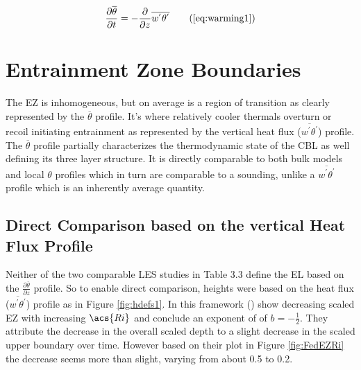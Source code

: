 \begin{equation}
\frac{\partial \overline{\theta}}{\partial t} = -\frac{\partial}{\partial z}\overline{w^{'}\theta^{'}} \tag{\ref{eq:warming1}}
\end{equation}

\section{Entrainment Zone Boundaries}
\label{sec:ezbound}
The \acs{EZ} is inhomogeneous, but on average is a region of transition as clearly represented by the $\overline{\theta}$ profile.  It's where relatively cooler thermals overturn or recoil initiating entrainment as represented by the vertical heat flux ($\overline{w^{'}\theta^{'}}$) profile.  The $\overline{\theta}$ profile partially characterizes the thermodynamic state of the \acs{CBL} as well defining its three layer structure.  It is directly comparable to both bulk models and local $\theta$ profiles which in turn are comparable to a sounding, unlike a $\overline{w^{'}\theta^{'}}$ profile which is an inherently average quantity.\\

\subsection{Direct Comparison based on the vertical Heat Flux Profile}
\label{subsec:comphfl}
Neither of the two comparable \acs{LES} studies in Table 3.3 define the \acs{EL} based on the $\frac{\partial \overline{\theta}}{\partial z}$ profile.  So to enable direct comparison, heights were based on the heat flux ($\overline{w^{'}\theta^{'}}$) profile as in Figure \ref{fig:hdefs1}.  In this framework \citeauthor{FedConzMir04} (\citeyear{FedConzMir04}) show decreasing scaled \acs{EZ} with increasing $\acs{Ri}$ and conclude an exponent of of $b = -\frac{1}{2}$.  They attribute the decrease in the overall scaled depth to a slight decrease in the scaled upper boundary over time.  However based on their plot in Figure \ref{fig:FedEZRi} the decrease seems more than slight, varying from about 0.5 to 0.2.\\

